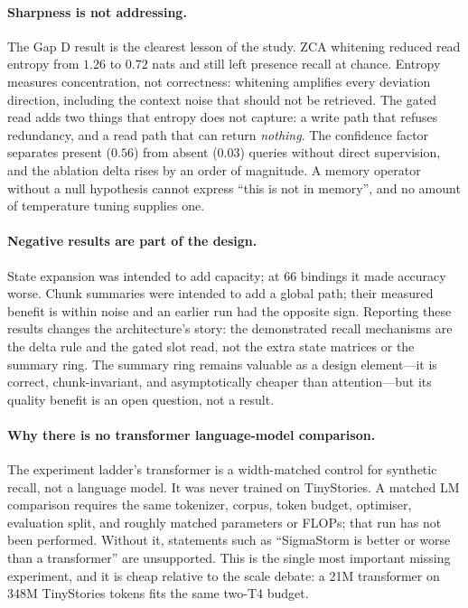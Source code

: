 \paragraph{Sharpness is not addressing.}
The Gap D result is the clearest lesson of the study. ZCA whitening reduced read entropy from
$1.26$ to $0.72$ nats and still left presence recall at chance. Entropy measures concentration,
not correctness: whitening amplifies every deviation direction, including the context noise
that should not be retrieved. The gated read adds two things that entropy does not capture: a
write path that refuses redundancy, and a read path that can return \emph{nothing}. The
confidence factor separates present ($0.56$) from absent ($0.03$) queries without direct
supervision, and the ablation delta rises by an order of magnitude. A memory operator without a
null hypothesis cannot express ``this is not in memory'', and no amount of temperature tuning
supplies one.

\paragraph{Negative results are part of the design.}
State expansion was intended to add capacity; at 66 bindings it made accuracy worse. Chunk
summaries were intended to add a global path; their measured benefit is within noise and an
earlier run had the opposite sign. Reporting these results changes the architecture's story:
the demonstrated recall mechanisms are the delta rule and the gated slot read, not the extra
state matrices or the summary ring. The summary ring remains valuable as a design element---it
is correct, chunk-invariant, and asymptotically cheaper than attention---but its quality
benefit is an open question, not a result.

\paragraph{Why there is no transformer language-model comparison.}
The experiment ladder's transformer is a width-matched control for synthetic recall, not a
language model. It was never trained on TinyStories. A matched LM comparison requires the same
tokenizer, corpus, token budget, optimiser, evaluation split, and roughly matched parameters or
FLOPs; that run has not been performed. Without it, statements such as ``SigmaStorm is better
or worse than a transformer'' are unsupported. This is the single most important missing
experiment, and it is cheap relative to the scale debate: a 21M transformer on 348M TinyStories
tokens fits the same two-T4 budget.

